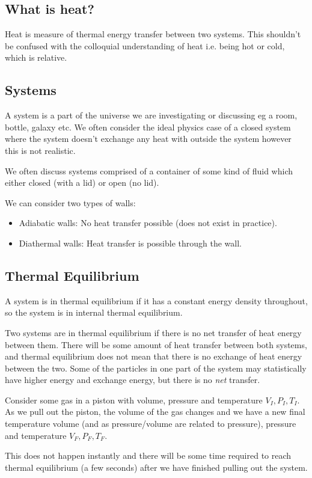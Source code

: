 \subsection{What is heat?}
Heat is measure of thermal energy transfer between two systems. This shouldn't be confused with the colloquial understanding of heat i.e. being hot or cold, which is relative.

\subsection{Systems}
A system is a part of the universe we are investigating or discussing eg a room, bottle, galaxy etc. We often consider the ideal physics case of a closed system where the system doesn't exchange any heat with outside the system however this is not realistic.

We often discuss systems comprised of a container of some kind of fluid which either closed (with a lid) or open (no lid). 

We can consider two types of walls:
\begin{itemize}
    \item Adiabatic walls: No heat transfer possible (does not exist in practice).
    \item Diathermal walls: Heat transfer is possible through the wall.
\end{itemize}
\subsection{Thermal Equilibrium}
A system is in thermal equilibrium if it has a constant energy density throughout, so the system is in internal thermal equilibrium.

Two systems are in thermal equilibrium if there is no net transfer of heat energy between them. There will be some amount of heat transfer between both systems, and thermal equilibrium does not mean that there is no exchange of heat energy between the two. Some of the particles in one part of the system may statistically have higher energy and exchange energy, but there is no \emph{net} transfer.

Consider some gas in a piston with volume, pressure and temperature $V_I, P_I, T_I$. As we pull out the piston, the volume of the gas changes and we have a new final temperature volume (and as pressure/volume are related to pressure), pressure and temperature $V_F, P_F, T_F$.

This does not happen instantly and there will be some time required to reach thermal equilibrium (a few seconds) after we have finished pulling out the system.

